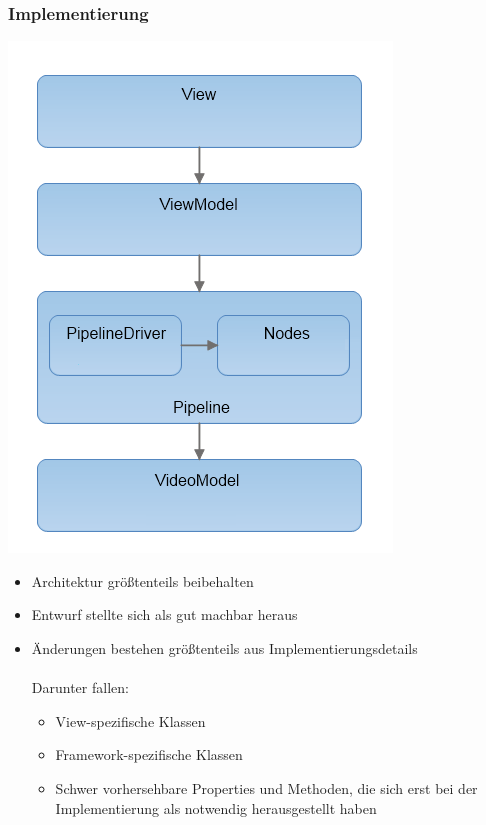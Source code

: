 \documentclass[t]{beamer}
\begin{document}
\begin{frame}
    \frametitle{Implementierung}
    \noindent
    \begin{minipage}{3.5cm}
        \includegraphics[scale=0.37]{Layers.png}
    \end{minipage}
    \hfill
    \begin{minipage}{8cm}
    \begin{itemize}
        \item<+-> Architektur größtenteils beibehalten
        \item<+-> Entwurf stellte sich als gut machbar heraus
        \item<+-> Änderungen bestehen größtenteils aus Implementierungsdetails ~\\ ~\\
        Darunter fallen:
        \begin{itemize}
            \item<+-> View-spezifische Klassen
            \item<+-> Framework-spezifische Klassen
            \item<+-> Schwer vorhersehbare Properties und Methoden, die sich erst bei der Implementierung als notwendig herausgestellt haben
        \end{itemize}
    \end{itemize}
    \end{minipage}
\end{frame}
\end{document}
